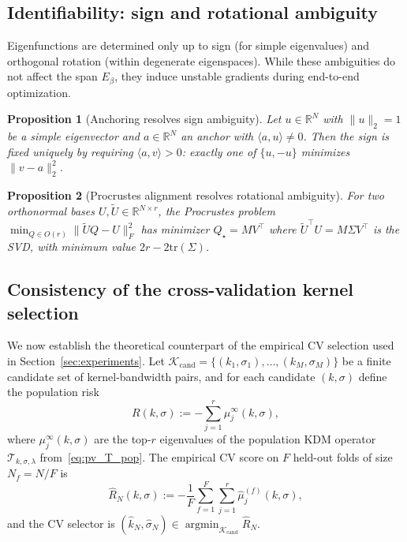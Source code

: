 \documentclass[11pt]{article}
\newtheorem{proposition}{Proposition}[section]
\theoremstyle{remark}
\begin{document}
\subsection{Identifiability: sign and rotational ambiguity}
\label{subsec:identifiability}

Eigenfunctions are determined only up to sign (for simple eigenvalues) and orthogonal rotation (within degenerate eigenspaces).
While these ambiguities do not affect the span $E_\beta$, they induce unstable gradients during end-to-end optimization.

\begin{proposition}[Anchoring resolves sign ambiguity]
\label{prop:sign-fixing}
Let $u\in\mathbb{R}^N$ with $\|u\|_2=1$ be a simple eigenvector and $a\in\mathbb{R}^N$ an anchor with $\langle a,u\rangle\ne 0$.
Then the sign is fixed uniquely by requiring $\langle a,v\rangle>0$: exactly one of $\{u,-u\}$ minimizes $\|v-a\|_2^2$.
\end{proposition}

\begin{proposition}[Procrustes alignment resolves rotational ambiguity]
\label{prop:procrustes}
For two orthonormal bases $U,\widetilde{U}\in\mathbb{R}^{N\times r}$, the Procrustes problem $\min_{Q\in O(r)}\|\widetilde{U}Q-U\|_F^2$ has minimizer $Q_\star=MV^\top$ where $\widetilde{U}^\top U=M\Sigma V^\top$ is the SVD, with minimum value $2r-2\mathrm{tr}(\Sigma)$.
\end{proposition}

\subsection{Consistency of the cross-validation kernel selection}
\label{subsec:consistency}

We now establish the theoretical counterpart of the empirical CV selection used in Section~\ref{sec:experiments}.
Let $\mathcal{K}_\text{cand}=\{(k_1,\sigma_1),\ldots,(k_M,\sigma_M)\}$ be a finite candidate set of kernel-bandwidth pairs, and for each candidate $(k,\sigma)$ define the population risk
\begin{equation}
\label{eq:pop-risk}
R(k,\sigma) := -\sum_{j=1}^r \mu_j^\infty(k,\sigma),
\end{equation}
where $\mu_j^\infty(k,\sigma)$ are the top-$r$ eigenvalues of the population KDM operator $\mathcal{T}_{k,\sigma,\lambda}$ from~\eqref{eq:pv_T_pop}.
The empirical CV score on $F$ held-out folds of size $N_f=N/F$ is
\begin{equation}
\label{eq:emp-cv}
\widehat{R}_N(k,\sigma) := -\frac{1}{F}\sum_{f=1}^F \sum_{j=1}^r \widehat{\mu}_j^{(f)}(k,\sigma),
\end{equation}
and the CV selector is $(\hat k_N,\hat\sigma_N) \in \operatorname*{argmin}_{\mathcal{K}_\text{cand}} \widehat{R}_N$.
\end{document}
